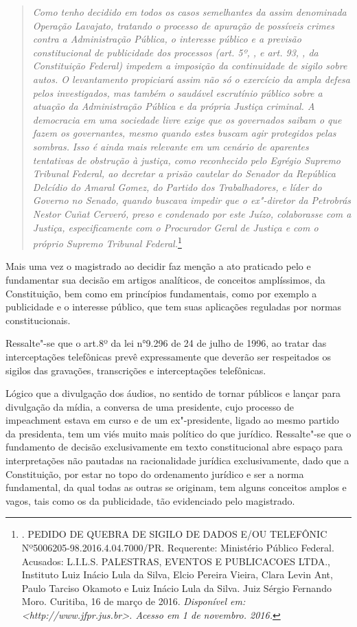 \begin{quote}
\emph{Como tenho decidido em todos os casos semelhantes da assim
denominada Operação Lavajato, tratando o processo de apuração de
possíveis crimes contra a Administração Pública, o interesse público e a
previsão constitucional de publicidade dos processos (art. 5º, , e
art. 93, , da Constituição Federal) impedem a imposição da
continuidade de sigilo sobre autos. O levantamento propiciará assim não
só o exercício da ampla defesa pelos investigados, mas também o saudável
escrutínio público sobre a atuação da Administração Pública e da própria
Justiça criminal. A democracia em uma sociedade livre exige que os
governados saibam o que fazem os governantes, mesmo quando estes buscam
agir protegidos pelas sombras.} \emph{Isso é ainda mais relevante em um
cenário de aparentes tentativas de obstrução à justiça, como reconhecido
pelo Egrégio Supremo Tribunal Federal, ao decretar a prisão cautelar do
Senador da República Delcídio do Amaral Gomez, do Partido dos
Trabalhadores, e líder do Governo no Senado, quando buscava impedir que
o ex"-diretor da Petrobrás Nestor Cuñat Cerveró, preso e condenado por
este Juízo, colaborasse com a Justiça, especificamente com o Procurador
Geral de Justiça e com o próprio Supremo Tribunal Federal.}\footnote{.
  PEDIDO DE QUEBRA DE SIGILO DE DADOS E/OU TELEFÔNIC
  Nº5006205-98.2016.4.04.7000/PR. Requerente: Ministério Público
  Federal. Acusados: L.I.L.S. PALESTRAS, EVENTOS E PUBLICACOES LTDA.,
  Instituto Luiz Inácio Lula da Silva, Elcio Pereira Vieira, Clara Levin
  Ant, Paulo Tarciso Okamoto e Luiz Inácio Lula da Silva. Juiz Sérgio
  Fernando Moro. Curitiba, 16 de março de 2016. \emph{Disponível em:
  \textless{}http://www.jfpr.jus.br\textgreater{}. Acesso em 1 de
  novembro. 2016.}}
\end{quote}

Mais uma vez o magistrado ao decidir faz menção a ato praticado pelo 
e fundamentar sua decisão em artigos analíticos, de conceitos
amplíssimos, da Constituição, bem como em princípios fundamentais, como
por exemplo a publicidade e o interesse público, que tem suas aplicações
reguladas por normas constitucionais.

Ressalte"-se que o art.8º da lei n°9.296 de 24 de julho de 1996, ao
tratar das interceptações telefônicas prevê expressamente que deverão
ser respeitados os sigilos das gravações, transcrições e interceptações
telefônicas.

Lógico que a divulgação dos áudios, no sentido de tornar públicos e
lançar para divulgação da mídia, a conversa de uma presidente, cujo
processo de impeachment estava em curso e de um ex"-presidente, ligado ao
mesmo partido da presidenta, tem um viés muito mais político do que
jurídico. Ressalte"-se que o fundamento de decisão exclusivamente em
texto constitucional abre espaço para interpretações não pautadas na
racionalidade jurídica exclusivamente, dado que a Constituição, por
estar no topo do ordenamento jurídico e ser a norma fundamental, da qual
todas as outras se originam, tem alguns conceitos amplos e vagos, tais
como os da publicidade, tão evidenciado pelo magistrado.

